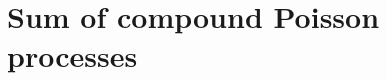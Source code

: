 \documentclass[12pt, twoside, english, headsepline]{article}
\theoremstyle{definition} %
\numberwithin{equation}{section} %
\begin{document}
%
%


\section{Sum of compound Poisson processes}\label{appendiceDimostrazioneLemmaSommaPoissonComposti}
\end{document}
